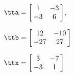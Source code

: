 {$\tta = \left[\hskip -3pt \begin{array}{cc} 1&-3 \\    -3&6 \end{array}\hskip -3pt \right] $, 

$\ttb=\left[\hskip -3pt \begin{array}{cc} 12&-10\\    -27 & 27  \end{array}\hskip -3pt \right] $}
{$\ttx=\left[\hskip -3pt \begin{array}{cc} 3&-7\\    -3&1  \end{array}\hskip -3pt \right] $}
